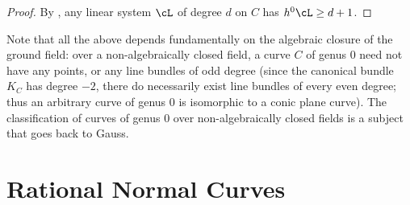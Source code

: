 \begin{proof}
 By \trr, any linear system $\cL$ of degree $d$ on $C$ has $h^0\cL \geq d+1$.
\end{proof}

Note that all the above depends fundamentally on the algebraic closure of the ground field: over a non-algebraically closed field, a curve $C$ of genus 0 need not have any points, or any line bundles of odd degree (since the canonical bundle $K_C$ has degree $-2$, there do necessarily exist line bundles of every even degree; thus an arbitrary curve of genus 0 is isomorphic to a conic plane curve). 
The classification of curves of genus 0 over non-algebraically closed fields is a subject that goes back to Gauss.



\section{Rational Normal Curves}\label{rational normal curves section}

